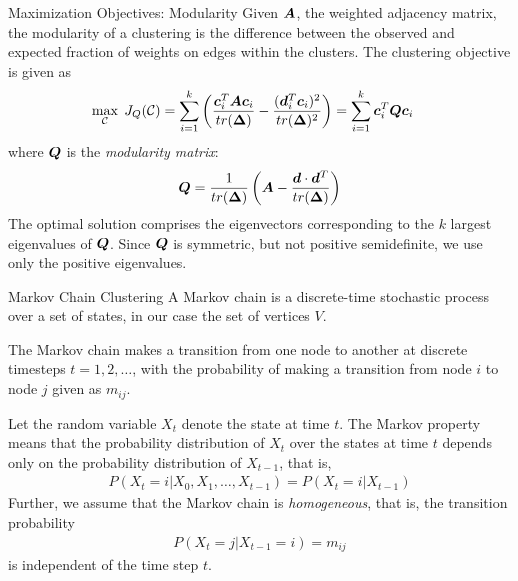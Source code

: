 \begin{frame}{Maximization Objectives: Modularity}
Given ${\boldsymbol A}$, the weighted adjacency
matrix, the modularity of a clustering is the
difference between the observed and expected fraction of weights
on edges within the clusters. 
The clustering objective is given as
\begin{align*}
    \max_{{\mathcal C}} \; J_{Q}({\mathcal C}) &= \sum_{i=1}^k
    \left( {{\boldsymbol c}_i^T {\boldsymbol A} {\boldsymbol c}_i \over tr({\bm \Delta})} -
        {({\boldsymbol d}_i^T {\boldsymbol c}_i)^2 \over tr({\bm \Delta})^2}
    \right)
    = \sum_{i=1}^k {\boldsymbol c}_i^T {\boldsymbol Q} {\boldsymbol c}_i
\end{align*}
where ${\boldsymbol Q}$ is the {\em modularity matrix}:
\begin{align*}
    {\boldsymbol Q} = {1 \over tr({\bm \Delta})} \left({\boldsymbol A} - {{\boldsymbol d} \cdot
    {\boldsymbol d}^T \over tr({\bm \Delta})} \right)
\end{align*}
The optimal solution comprises the eigenvectors corresponding to the $k$
largest eigenvalues of ${\boldsymbol Q}$.
Since ${\boldsymbol Q}$ is
symmetric, but not positive semidef\/{i}nite, we use only 
the positive eigenvalues.
\end{frame}


\begin{frame}{Markov Chain Clustering}
A Markov chain is a discrete-time stochastic process
over a set of states, in our case the set of vertices $V$. 

\medskip
The
Markov chain makes a transition from one node to another at
discrete timesteps $t=1,2,\dots$, with the probability of making
a transition from node $i$ to node $j$ given as $m_{ij}$. 

\medskip
Let the
random variable $X_t$ denote the state at time $t$. The Markov
property means that the probability distribution of $X_t$ over the
states at time $t$ depends only on the probability distribution of
$X_{t-1}$, that is,
\begin{align*}
P(X_{t}=i | X_0, X_1, \dots, X_{t-1}) = P(X_{t}=i | X_{t-1})
\end{align*}
Further, we assume that the Markov chain is {\em homogeneous},
that is, the transition probability
\begin{align*}
P(X_t = j | X_{t-1} = i) = m_{ij}
\end{align*}
is independent of the time step $t$.
\end{frame}



